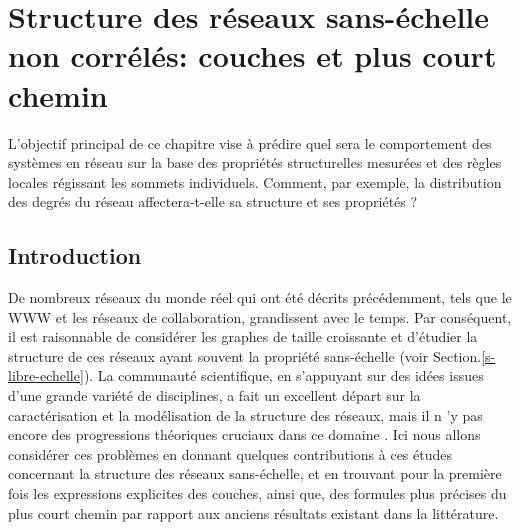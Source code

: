 \newcommand{\nl}{$n_{\ell}$ }
\newcommand{\km}{\textless k \textgreater}
\chapter{Structure des réseaux sans-échelle non corrélés: couches et plus court chemin}
\label{sec3}
L'objectif principal de ce chapitre vise à prédire quel sera le comportement des systèmes en réseau sur la base des propriétés structurelles mesurées et des règles locales régissant les sommets individuels. Comment, par exemple, la distribution des degrés du réseau affectera-t-elle sa  structure et ses propriétés ?

\section{Introduction}

De nombreux réseaux du monde réel qui ont été décrits précédemment, tels que le WWW et les réseaux de collaboration, grandissent avec le temps. Par conséquent, il est raisonnable de considérer les graphes de taille croissante et d'étudier la structure de ces réseaux ayant souvent la propriété sans-échelle (voir Section.\ref{s-libre-echelle}). 
La communauté scientifique, en s'appuyant sur des idées issues d'une grande variété de disciplines, a fait un excellent départ sur la caractérisation et la modélisation de la structure des réseaux, mais il n 'y pas encore des progressions théoriques cruciaux dans ce domaine \cite{Ne2003}. Ici nous allons considérer ces problèmes en donnant quelques contributions à ces études concernant la structure des réseaux sans-échelle, et en trouvant pour la première fois les expressions explicites des couches, ainsi que, des formules plus précises du plus court chemin par rapport aux anciens résultats existant dans la littérature. 
